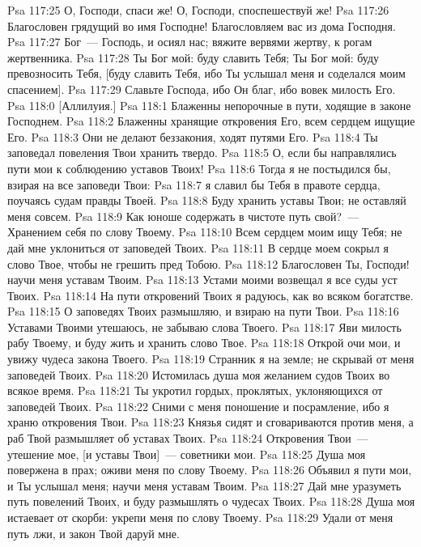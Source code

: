 \vs Psa 117:25 О, Господи, спаси же! О, Господи, споспешествуй же!
\vs Psa 117:26 Благословен грядущий во имя Господне! Благословляем вас из дома Господня.
\vs Psa 117:27 Бог~--- Господь, и осиял нас; вяжите вервями жертву,  к рогам жертвенника.
\vs Psa 117:28 Ты Бог мой: буду славить Тебя; Ты Бог мой: буду превозносить Тебя, [буду славить Тебя, ибо Ты услышал меня и соделался моим спасением].
\vs Psa 117:29 Славьте Господа, ибо Он благ, ибо вовек милость Его.
\vs Psa 118:0 [Аллилуия.]
\rsbpar\vs Psa 118:1 Блаженны непорочные в пути, ходящие в законе Господнем.
\vs Psa 118:2 Блаженны хранящие откровения Его, всем сердцем ищущие Его.
\vs Psa 118:3 Они не делают беззакония, ходят путями Его.
\vs Psa 118:4 Ты заповедал повеления Твои хранить твердо.
\vs Psa 118:5 О, если бы направлялись пути мои к соблюдению уставов Твоих!
\vs Psa 118:6 Тогда я не постыдился бы, взирая на все заповеди Твои:
\vs Psa 118:7 я славил бы Тебя в правоте сердца, поучаясь судам правды Твоей.
\vs Psa 118:8 Буду хранить уставы Твои; не оставляй меня совсем.
\vs Psa 118:9 Как юноше содержать в чистоте путь свой?~--- Хранением себя по слову Твоему.
\vs Psa 118:10 Всем сердцем моим ищу Тебя; не дай мне уклониться от заповедей Твоих.
\vs Psa 118:11 В сердце моем сокрыл я слово Твое, чтобы не грешить пред Тобою.
\vs Psa 118:12 Благословен Ты, Господи! научи меня уставам Твоим.
\vs Psa 118:13 Устами моими возвещал я все суды уст Твоих.
\vs Psa 118:14 На пути откровений Твоих я радуюсь, как во всяком богатстве.
\vs Psa 118:15 О заповедях Твоих размышляю, и взираю на пути Твои.
\vs Psa 118:16 Уставами Твоими утешаюсь, не забываю слова Твоего.
\vs Psa 118:17 Яви милость рабу Твоему, и буду жить и хранить слово Твое.
\vs Psa 118:18 Открой очи мои, и увижу чудеса закона Твоего.
\vs Psa 118:19 Странник я на земле; не скрывай от меня заповедей Твоих.
\vs Psa 118:20 Истомилась душа моя желанием судов Твоих во всякое время.
\vs Psa 118:21 Ты укротил гордых, проклятых, уклоняющихся от заповедей Твоих.
\vs Psa 118:22 Сними с меня поношение и посрамление, ибо я храню откровения Твои.
\vs Psa 118:23 Князья сидят и сговариваются против меня, а раб Твой размышляет об уставах Твоих.
\vs Psa 118:24 Откровения Твои~--- утешение мое, [и уставы Твои]~--- советники мои.
\vs Psa 118:25 Душа моя повержена в прах; оживи меня по слову Твоему.
\vs Psa 118:26 Объявил я пути мои, и Ты услышал меня; научи меня уставам Твоим.
\vs Psa 118:27 Дай мне уразуметь путь повелений Твоих, и буду размышлять о чудесах Твоих.
\vs Psa 118:28 Душа моя истаевает от скорби: укрепи меня по слову Твоему.
\vs Psa 118:29 Удали от меня путь лжи, и закон Твой даруй мне.
